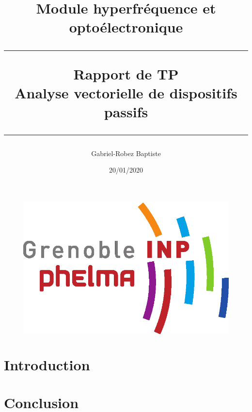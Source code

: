 \documentclass{article}
\title{Module hyperfréquence et optoélectronique \\ \bigskip \bigskip \hrule width 16.5cm \bigskip \textbf{Rapport de TP \\ Analyse vectorielle de dispositifs passifs \\} \bigskip \hrule width 16.5cm}
\author{Gabriel-Robez Baptiste}
\date{20/01/2020}
\begin{document}
\maketitle

\renewcommand{\contentsname}{Sommaire}  %
\tableofcontents

\bigskip

\begin{figure}[!ht]
\centering
\includegraphics[scale=0.15]{logo_phelma.png}
\end{figure}

\clearpage




\section{Introduction}

\section{Conclusion}
\end{document}
